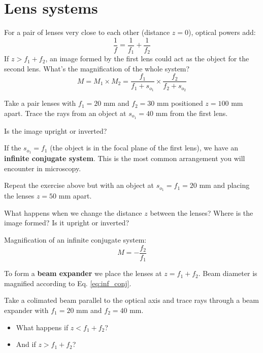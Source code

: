 \documentclass{article}
\newcommand{\nexercise}[0]{\arabic{exercises}\addtocounter{exercises}{1}}
\begin{document}
\newpage
\section{Lens systems}
For a pair of lenses very close to each other (distance $z=0$), optical powers add:
\begin{equation}
	\frac{1}{f} = \frac{1}{f_1} + \frac{1}{f_2}
\end{equation}
If $z>f_1+f_2$, an image formed by the first lens could act as the object for the second lens. What's the magnification of the whole system?
\begin{equation}
	M = M_1 \times M_2 = 
	\frac{f_1}{f_1 + s_{o_1}} \times 
	\frac{f_2}{f_2 + s_{o_2}}
\end{equation}

\begin{exercisebox}[frametitle={Exercise \nexercise: Pair of lenses}]
Take a pair lenses with $f_1=20$ mm and $f_2=30$ mm positioned $z=100$ mm apart. Trace the rays from an object at $s_{o_1}=40$ mm from the first lens.

Is the image upright or inverted?
\end{exercisebox}

If the $s_{o_1} = f_1$ (the object is in the focal plane of the first lens), we have an \textbf{infinite conjugate system}. This is the most common arrangement you will encounter in microscopy.

\begin{exercisebox}[frametitle={Exercise \nexercise: Infinite conjugate}]
Repeat the exercise above but with an object at $s_{o_1}=f_1=20$ mm and placing the lenses $z=50$ mm apart.

What happens when we change the distance $z$ between the lenses? Where is the image formed? Is it upright or inverted?
\end{exercisebox}

Magnification of an infinite conjugate system:
\begin{equation}
\label{eq:inf_conj}
	M = - \frac{f_2}{f_1}
\end{equation} 

To form a \textbf{beam expander} we place the lenses at $z = f_1 + f_2$. Beam diameter is magnified according to Eq. \ref{eq:inf_conj}.

\begin{exercisebox}[frametitle={Exercise \nexercise: Beam expander}]
Take a colimated beam parallel to the optical axis and trace rays through a beam expander with $f_1=20$ mm and $f_2=40$ mm.
\begin{itemize}
	\item What happens if $z < f_1 + f_2$?
	\item And if $z > f_1 + f_2$?
\end{itemize}
\end{exercisebox}
\end{document}
